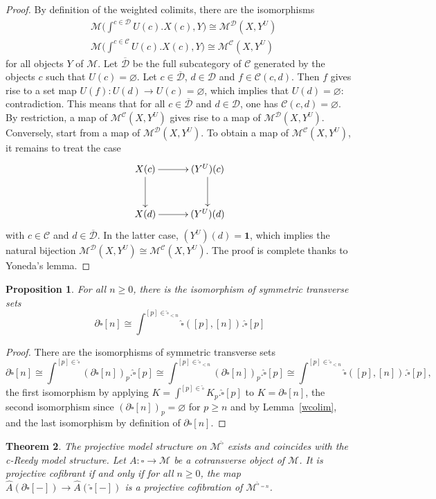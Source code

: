 \documentclass[a4paper,12pt]{amsart}
\makeatletter
\newcommand{\C}{\mathcal{C}}
\newcommand{\D}{\mathcal{D}}
\newcommand{\de}{\partial}
\newtheorem{thm}{Theorem}[section]
\newtheorem{prop}[thm]{Proposition}
\newcommand{\bp}{\begin{prop}}
\newcommand{\ep}{\end{prop}}
\newcommand{\bth}{\begin{thm}}
\renewcommand{\eth}{\end{thm}}
\newcommand{\bpf}{\begin{proof}}
\newcommand{\epf}{\end{proof}}
\theoremstyle{definition}
\newcommand{\fr}[1]{\ar@{->}[r]^-{#1}}
\newcommand{\fd}[1]{\ar@{->}[d]_-{#1}}
\newcommand{\iso}{\cong}
\renewcommand{\geq}{\geqslant}
\makeatother
\begin{document}
\bpf
By definition of the weighted colimits, there are the isomorphisms 
\begin{align*}
	& \mathcal{M}\bigg(\int^{c\in \D} U(c).X(c),Y\bigg) \iso \mathcal{M}^{\D}(X,Y^U)\\
	& \mathcal{M}\bigg(\int^{c\in \C} U(c).X(c),Y\bigg) \iso \mathcal{M}^{\C}(X,Y^U)
\end{align*}
for all objects $Y$ of $\mathcal{M}$. Let $\overline{\D}$ be the full subcategory of $\C$ generated by the objects $c$ such that $U(c)= \varnothing$. Let $c\in \overline{\D}$, $d\in \D$ and $f\in\C(c,d)$. Then $f$ gives rise to a set map $U(f):U(d)\to U(c)=\varnothing$, which implies that $U(d)=\varnothing$: contradiction. This means that for all $c\in \overline{\D}$ and $d\in \D$, one has $\C(c,d) =\varnothing$. By restriction, a map of $\mathcal{M}^{\C}(X,Y^U)$ gives rise to a map of $\mathcal{M}^{\D}(X,Y^U)$. Conversely, start from a map of $\mathcal{M}^{\D}(X,Y^U)$. To obtain a map of $\mathcal{M}^{\C}(X,Y^U)$, it remains to treat the case 
\[
\xymatrix@C=3em@R=3em
{
X(c) \fd{}\fr{} &(Y^U)(c) \fd{} \\
X(d) \fr{} & (Y^U)(d)
}
\]
with $c\in \C$ and $d\in \overline{\D}$. In the latter case, $(Y^U)(d)=\mathbf{1}$, which implies the natural bijection $\mathcal{M}^{\D}(X,Y^U)\iso \mathcal{M}^{\C}(X,Y^U)$. The proof is complete thanks to Yoneda's lemma. 
\epf


\bp \label{w-co-boundary}
For all $n\geq 0$, there is the isomorphism of symmetric transverse sets
\[
\de\widehat{\square}[n] \iso \int^{[p]\in \widehat{\square}_{<n}} \widehat{\square}([p],[n]).\widehat{\square}[p]
\]
\ep

\bpf
There are the isomorphisms of symmetric transverse sets
\[
\de\widehat{\square}[n] \iso \int^{[p]\in \widehat{\square}} (\de\widehat{\square}[n])_p.\widehat{\square}[p] \iso \int^{[p]\in \widehat{\square}_{<n}} (\de\widehat{\square}[n])_p.\widehat{\square}[p] \iso \int^{[p]\in \widehat{\square}_{<n}} \widehat{\square}([p],[n]).\widehat{\square}[p],
\]
the first isomorphism by applying $K=\int^{[p]\in \widehat{\square}} K_p.\widehat{\square}[p]$ to $K=\de\widehat{\square}[n]$, the second isomorphism since $(\de\widehat{\square}[n])_p=\varnothing$ for $p\geq n$ and by Lemma~\ref{wcolim}, and the last isomorphism by definition of $\de\widehat{\square}[n]$. 
\epf


\bth \label{proj-cof-suff-cond}
The projective model structure on $\mathcal{M}^{\widehat{\square}}$ exists and coincides with the c-Reedy model structure. Let $A:\widehat{\square}\to \mathcal{M}$ be a cotransverse object of $\mathcal{M}$. It is projective cofibrant if and only if for all $n\geq 0$, the map $\widehat{A}(\de\widehat{\square}[-]) \to \widehat{A}(\widehat{\square}[-])$ is a projective cofibration of $\mathcal{M}^{\widehat{\square}_{=n}}$.
\eth
\end{document}
